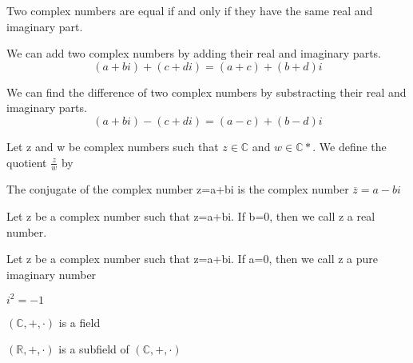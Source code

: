 \documentclass{article}
\begin{document}
\begin{definition}[Equality]
    Two complex numbers are equal if and only if they have the same real and
    imaginary part.
\end{definition}

\begin{definition}[Addition]
    We can add two complex numbers by adding their real and imaginary parts.
    $$ (a+bi) + (c+di) = (a+c) + (b+d) i$$
\end{definition}

\begin{definition}[Substraction]
    We can find the difference of two complex numbers by substracting their real
    and imaginary parts.
    $$ (a+bi) - (c+di) = (a-c) + (b-d) i$$
\end{definition}

\begin{definition}[Division]
    Let z and w be complex numbers such that $z \in \mathbb{C}$ and
    $w \in \mathbb{C}*$. We define the quotient $\frac{z}{w}$ by
\end{definition}

\begin{definition}[Conjugate]
    The conjugate of the complex number z=a+bi is the complex number
    $\overline{z} = a - bi $
\end{definition}

\begin{definition}
    Let z be a complex number such that z=a+bi. If b=0, then we call z a real
    number.
\end{definition}

\begin{definition}
    Let z be a complex number such that z=a+bi. If a=0, then we call z a pure
    imaginary number
\end{definition}

\begin{theorem}
    $i^2 = -1$
\end{theorem}

\begin{theorem}
    $ (\mathbb{C}, +, \cdot)$ is a field
\end{theorem}

\begin{corollary}
    $ (\mathbb{R}, +, \cdot)$ is a subfield of $ (\mathbb{C}, +, \cdot)$
\end{corollary}
\end{document}
